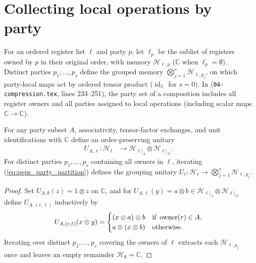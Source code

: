 \section{Collecting local operations by party}
\label{sec:peps_party_factorization}

\begin{definition}
    \label{def:peps_party_registers}
    \leanok
    For an ordered register list $\ell$ and party $p$, let $\ell_p$ be the sublist of registers owned by $p$ in their original order, with memory $\mathcal H_{\ell,p}$ ($\mathbb C$ when $\ell_p=\emptyset$). Distinct parties $p_1,\ldots,p_s$ define the grouped memory $\bigotimes_{j=1}^s\mathcal H_{\ell,p_j}$, on which party-local maps act by ordered tensor product ($\operatorname{id}_{\mathbb C}$ for $s=0$). In \cite[Theorem~5.2]{OpenAI2026PolynomialPEPS} (\texttt{04-compression.tex}, lines 233--251), the party set of a composition includes all register owners and all parties assigned to local operations (including scalar maps $\mathbb C\to\mathbb C$).
\end{definition}

\begin{definition}
    \label{def:peps_party_partition}
    \leanok
    For any party subset $A$, associativity, tensor-factor exchanges, and unit identifications with $\mathbb C$ define an order-preserving unitary
    \begin{align}
        U_{A,\ell}:\mathcal H_\ell
         & \longrightarrow \mathcal H_{\ell|_A}\otimes
        \mathcal H_{\ell|_{A^c}}.
        \label{eq:peps_party_partition}
    \end{align}
    For distinct parties $p_1,\ldots,p_s$ containing all owners in $\ell$, iterating (\ref{eq:peps_party_partition}) defines the grouping unitary $U_\ell:\mathcal H_\ell\to\bigotimes_{j=1}^s\mathcal H_{\ell,p_j}$.
\end{definition}

\begin{proof}\leanok
    Set $U_{A,\emptyset}(z)=1\otimes z$ on $\mathbb C$, and for $U_{A,\ell}(y)=a\otimes b\in\mathcal H_{\ell|_A}\otimes\mathcal H_{\ell|_{A^c}}$ define $U_{A,(r,\ell)}$ inductively by
    \begin{align}
        U_{A,(r,\ell)}(x\otimes y)
        =\begin{cases}
             (x\otimes a)\otimes b & \text{if }\operatorname{owner}(r)\in A, \\
             a\otimes(x\otimes b)  & \text{otherwise}.
         \end{cases}
        \notag
    \end{align}
    Iterating over distinct $p_1,\ldots,p_s$ covering the owners of $\ell$ extracts each $\mathcal H_{\ell,p_j}$ once and leaves an empty remainder $\mathcal H_\emptyset=\mathbb C$.
\end{proof}

